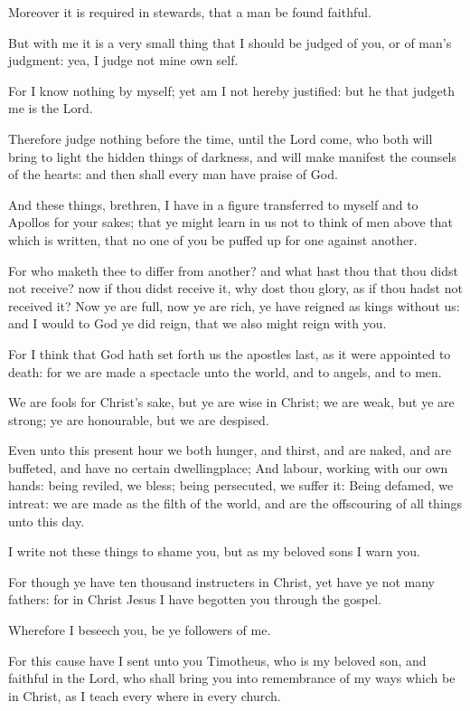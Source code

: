\verse Moreover it is required in stewards, that a man be found faithful.

\verse But with me it is a very small thing that I should be judged of you, or of man's judgment: yea, I judge not mine own self.

\verse For I know nothing by myself; yet am I not hereby justified: but he that judgeth me is the Lord.

\verse Therefore judge nothing before the time, until the Lord come, who both will bring to light the hidden things of darkness, and will make manifest the counsels of the hearts: and then shall every man have praise of God.

\verse And these things, brethren, I have in a figure transferred to myself and to Apollos for your sakes; that ye might learn in us not to think of men above that which is written, that no one of you be puffed up for one against another.

\verse For who maketh thee to differ from another? and what hast thou that thou didst not receive? now if thou didst receive it, why dost thou glory, as if thou hadst not received it?  \verse Now ye are full, now ye are rich, ye have reigned as kings without us: and I would to God ye did reign, that we also might reign with you.

\verse For I think that God hath set forth us the apostles last, as it were appointed to death: for we are made a spectacle unto the world, and to angels, and to men.

\verse We are fools for Christ's sake, but ye are wise in Christ; we are weak, but ye are strong; ye are honourable, but we are despised.

\verse Even unto this present hour we both hunger, and thirst, and are naked, and are buffeted, and have no certain dwellingplace; \verse And labour, working with our own hands: being reviled, we bless; being persecuted, we suffer it: \verse Being defamed, we intreat: we are made as the filth of the world, and are the offscouring of all things unto this day.

\verse I write not these things to shame you, but as my beloved sons I warn you.

\verse For though ye have ten thousand instructers in Christ, yet have ye not many fathers: for in Christ Jesus I have begotten you through the gospel.

\verse Wherefore I beseech you, be ye followers of me.

\verse For this cause have I sent unto you Timotheus, who is my beloved son, and faithful in the Lord, who shall bring you into remembrance of my ways which be in Christ, as I teach every where in every church.

